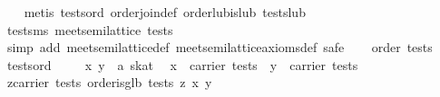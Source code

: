 \begin{isabellebody}
%
\isadelimproof
\ \ %
\endisadelimproof
%
\isatagproof
{}\isamarkupfalse%
\ {}metis\ tests{}ord\ order{}join{}def\ order{}lub{}is{}lub\ tests{}lub{}%
\endisatagproof
{\isafoldproof}%
%
\isadelimproof
\isanewline
%
\endisadelimproof
\isanewline
{}\isamarkupfalse%
\ tests{}ms{}\ {}meet{}semilattice\ tests{}\isanewline
%
\isadelimproof
%
\endisadelimproof
%
\isatagproof
{}\isamarkupfalse%
\ {}simp\ add{}\ meet{}semilattice{}def\ meet{}semilattice{}axioms{}def{}\ safe{}\isanewline
\ \ \isamarkupfalse%
\ {}order\ tests{}\ \isamarkupfalse%
\ tests{}ord\ \isamarkupfalse%
\isanewline
\isanewline
\ \ \isamarkupfalse%
\ x\ y\ {}{}\ {}{}a\ skat{}\ \isamarkupfalse%
\ {}x\ {}\ carrier\ tests{}\ \ {}y\ {}\ carrier\ tests{}\isanewline
\ \ \isamarkupfalse%
\ {}{}z{}carrier\ tests{}\ order{}is{}glb\ tests\ z\ {}x{}\ y{}{}\isanewline

\end{isabellebody}
